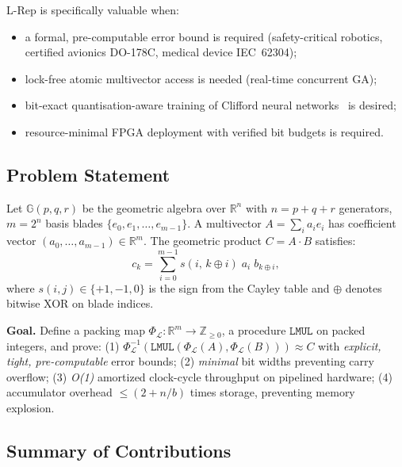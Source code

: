 \documentclass[11pt,a4paper]{article}
\theoremstyle{definition}
\theoremstyle{plain}
\theoremstyle{remark}
\newcommand{\GA}{\mathbb{G}}
\newcommand{\Pack}{\Phi_{\mathcal{L}}}
\newcommand{\Unpack}{\Phi^{-1}_{\mathcal{L}}}
\newcommand{\reals}{\mathbb{R}}
\begin{document}
L-Rep is specifically valuable when:
\begin{itemize}
  \item a formal, pre-computable error bound is required
        (safety-critical robotics, certified avionics DO-178C,
        medical device IEC~62304);
  \item lock-free atomic multivector access is needed
        (real-time concurrent GA);
  \item bit-exact quantisation-aware training of Clifford neural
        networks~\cite{brandstetter2023,ruhe2023} is desired;
  \item resource-minimal FPGA deployment with verified bit budgets is
        required.
\end{itemize}

\subsection{Problem Statement}

Let $\GA(p,q,r)$ be the geometric algebra over $\reals^{n}$ with
$n = p+q+r$ generators, $m = 2^n$ basis blades
$\{e_0, e_1, \ldots, e_{m-1}\}$.
A multivector $A = \sum_i a_i e_i$ has coefficient vector
$(a_0, \ldots, a_{m-1}) \in \reals^m$.
The geometric product $C = A \cdot B$ satisfies:
\begin{equation}\label{eq:gaprod}
  c_k = \sum_{i=0}^{m-1} s(i,\, k\oplus i)\;\! a_i\;\! b_{k\oplus i},
\end{equation}
where $s(i,j) \in \{+1, -1, 0\}$ is the sign from the Cayley table
and $\oplus$ denotes bitwise XOR on blade indices.

\begin{keyresult}
\textbf{Goal.}
Define a packing map $\Pack: \reals^m \to \mathbb{Z}_{\ge 0}$, a
procedure $\mathtt{LMUL}$ on packed integers, and prove:
(1) $\Unpack(\mathtt{LMUL}(\Pack(A), \Pack(B))) \approx C$
with \emph{explicit, tight, pre-computable} error bounds;
(2) \emph{minimal} bit widths preventing carry overflow;
(3) \emph{O(1)} amortized clock-cycle throughput on pipelined hardware;
(4) accumulator overhead $\le (2 + n/b)$ times storage, preventing
memory explosion.
\end{keyresult}

\subsection{Summary of Contributions}
\end{document}
